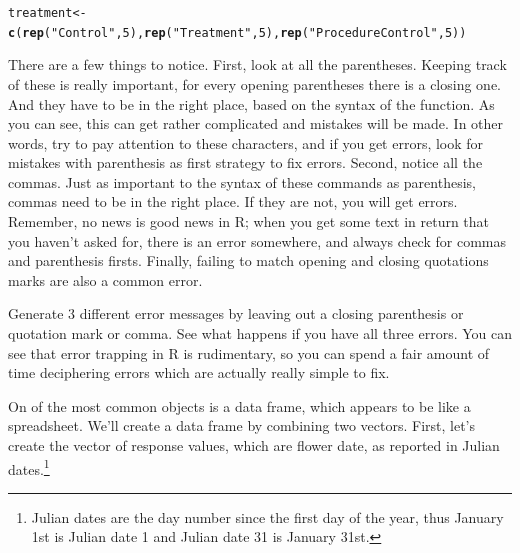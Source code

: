 \documentclass{tufte-handout}\usepackage[]{graphicx}\usepackage[]{color}
\makeatletter
\newcommand{\hlnum}[1]{\textcolor[rgb]{0.686,0.059,0.569}{#1}}%
\newcommand{\hlstr}[1]{\textcolor[rgb]{0.192,0.494,0.8}{#1}}%
\newcommand{\hlstd}[1]{\textcolor[rgb]{0.345,0.345,0.345}{#1}}%
\newcommand{\hlkwb}[1]{\textcolor[rgb]{0.69,0.353,0.396}{#1}}%
\newcommand{\hlkwd}[1]{\textcolor[rgb]{0.737,0.353,0.396}{\textbf{#1}}}%
\newenvironment{kframe}{%
 \def\at@end@of@kframe{}%
 \ifinner\ifhmode%
  \def\at@end@of@kframe{\end{minipage}}%
  \begin{minipage}{\columnwidth}%
 \fi\fi%
 \def\FrameCommand##1{\hskip\@totalleftmargin \hskip-\fboxsep
 \colorbox{shadecolor}{##1}\hskip-\fboxsep
     \hskip-\linewidth \hskip-\@totalleftmargin \hskip\columnwidth}%
 \MakeFramed {\advance\hsize-\width
   \@totalleftmargin\z@ \linewidth\hsize
   \@setminipage}}%
 {\par\unskip\endMakeFramed%
 \at@end@of@kframe}
\newenvironment{knitrout}{}{} %
\makeatother
\begin{document}
\begin{knitrout}
\color{fgcolor}\begin{kframe}
\begin{alltt}
\hlstd{treatment} \hlkwb{<-} \hlkwd{c}\hlstd{(}\hlkwd{rep}\hlstd{(}\hlstr{"Control"}\hlstd{,} \hlnum{5}\hlstd{),} \hlkwd{rep}\hlstd{(}\hlstr{"Treatment"}\hlstd{,} \hlnum{5}\hlstd{),} \hlkwd{rep}\hlstd{(}\hlstr{"Procedure Control"}\hlstd{,} \hlnum{5}\hlstd{))}
\end{alltt}
\end{kframe}
\end{knitrout}

There are a few things to notice. First, look at all the parentheses. Keeping track of these is really important, for every opening parentheses there is a closing one. And they have to be in the right place, based on the syntax of the function. As you can see, this can get rather complicated and mistakes will be made. In other words, try to pay attention to these characters, and if you get errors, look for mistakes with parenthesis as first strategy to fix errors. Second, notice all the commas. Just as important to the syntax of these commands as parenthesis, commas need to be in the right place. If they are not, you will get errors. Remember, no news is good news in R; when you get some text in return that you haven't asked for, there is an error somewhere, and always check for commas and parenthesis firsts. Finally, failing to match opening and closing quotations marks are also a common error. 

Generate 3 different error messages by leaving out a closing parenthesis or quotation mark or comma. See what happens if you have all three errors. You can see that error trapping in R is rudimentary, so you can spend a fair amount of time deciphering errors which are actually really simple to fix. 

On of the most common objects is a data frame, which appears to be like a spreadsheet. We'll create a data frame by combining two vectors. First, let's create the vector of response values, which are flower date, as reported in Julian dates.\footnote[][-1.1cm]{Julian dates are the day number since the first day of the year, thus January 1st is Julian date 1 and Julian date 31 is January 31st.}
\end{document}
